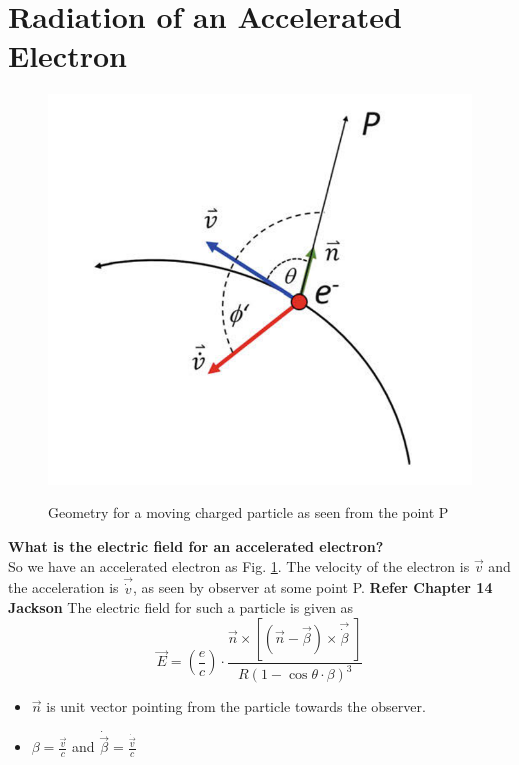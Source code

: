 \documentclass[12pt]{report}
\newcommand{\cc}[1]{\left({#1}\right)}
\newcommand{\rr}[1]{\left[{#1}\right]}
\newcommand{\vd}[1]{\dot{\vec{#1}}}
\begin{document}
\section{Radiation of an Accelerated Electron}
\begin{figure}[th]
\includegraphics[scale=0.7]{singleprad.png}\label{singleprad}
\caption{Geometry for a moving charged particle as seen from the point P}
\end{figure}
\textbf{What is the electric field for an accelerated electron?}\\
So we have an accelerated electron as Fig. \ref{singleprad}. The velocity of the electron is $\vec{v}$ and the acceleration is $\vec{\dot{v}}$, as seen by observer at some point P. \textbf{Refer Chapter 14 Jackson} The electric field for such a particle is given as
\begin{equation}
\vec{E}=\cc{\frac{e}{c}}\cdot \frac{\vec{n}\times \rr{\cc{\vec{n}-\vec{\beta}}\times \vec{\dot{\beta}}\;}}{R\cc{1-\cos\theta \cdot \beta}^3}
\end{equation}
\begin{itemize}
\item $\vec{n}$ is unit vector pointing from the particle towards the observer.
\item $\beta=\frac{\vec{v}}{c}$ and $\vd{\beta}=\frac{\vd{v}}{c}$
\end{itemize}
\end{document}
